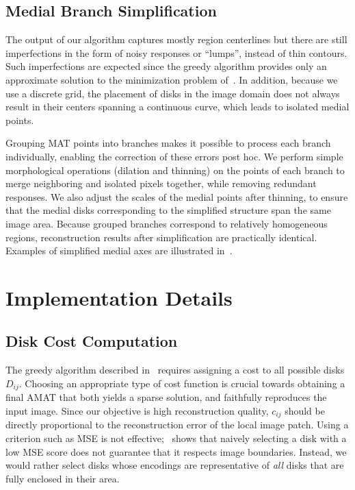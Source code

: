 \documentclass[10pt,twocolumn,letterpaper]{article}
\begin{document}
\subsection{Medial Branch Simplification}\label{sec:method:simplification}
The output of our algorithm captures mostly region centerlines but there are still
imperfections in the form of noisy responses or ``lumps'', instead of thin contours.
Such imperfections are expected since the greedy algorithm provides only an approximate solution
to the minimization problem of~. 
In addition, because we use a discrete grid, the placement of disks 
in the image domain does not always result in their centers spanning a continuous curve, 
which leads to isolated medial points.

Grouping MAT points into branches makes it possible to process each branch individually, enabling
the correction of these errors post hoc.
We perform simple morphological operations (dilation and thinning) 
on the points of each branch to merge neighboring and isolated pixels together, while removing 
redundant responses. 
We also adjust the scales of the medial points after thinning, to ensure that the medial disks corresponding 
to the simplified structure span the same image area.
Because grouped branches correspond to relatively homogeneous regions, reconstruction
results after simplification are practically identical.
Examples of simplified medial axes are illustrated in~.


\section{Implementation Details}\label{sec:implementation}
\subsection{Disk Cost Computation}\label{sec:implementation:diskcost}
The greedy algorithm described in~ requires assigning a cost to all possible disks $D_{ij}$.
Choosing an appropriate type of cost function is crucial towards obtaining a final AMAT that both 
yields a sparse solution, and faithfully reproduces the input image.
Since our objective is high reconstruction quality, $c_{ij}$ should be directly proportional
to the reconstruction error of the local image patch.
Using a criterion such as MSE is not effective;~ shows that naively selecting a disk with 
a low MSE score does not guarantee that it respects image boundaries.
Instead, we would rather select disks whose encodings are representative of \emph{all} disks that are fully enclosed
in their area. 
\end{document}
